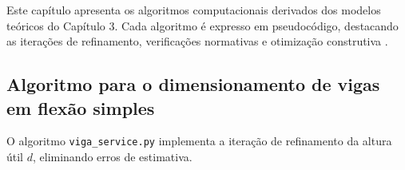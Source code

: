 
Este capítulo apresenta os algoritmos computacionais derivados dos modelos teóricos do Capítulo 3. 
Cada algoritmo é expresso em pseudocódigo, destacando as iterações de refinamento, verificações normativas e otimização construtiva \cite{EN1992,CachimPreEforco}.

\subsection{Algoritmo para o dimensionamento de vigas em flexão simples}
O algoritmo \texttt{viga\_service.py} implementa a iteração de refinamento da altura útil $d$, eliminando erros de estimativa.

